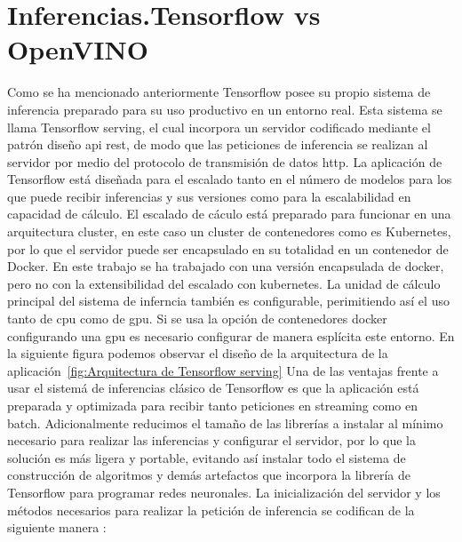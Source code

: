 \section{Inferencias.Tensorflow vs OpenVINO}\label{sec:inferencias.-Tensorflow-vs-OpenVINO}
Como se ha mencionado anteriormente Tensorflow posee su propio sistema de inferencia preparado para su uso productivo en un entorno real.
Esta sistema se llama Tensorflow serving, el cual incorpora un servidor codificado mediante el patrón diseño api rest, de modo que las peticiones
de inferencia se realizan al servidor por medio del protocolo de transmisión de datos http.
La aplicación de Tensorflow está diseñada para el escalado tanto en el número de modelos para los que puede recibir inferencias y sus versiones como para la escalabilidad en capacidad de cálculo.
El escalado de cáculo está preparado para funcionar en una arquitectura cluster, en este caso un cluster de contenedores como es Kubernetes, por lo que el servidor puede ser
encapsulado en su totalidad en un contenedor de Docker.
En este trabajo se ha trabajado con una versión encapsulada de docker, pero no con la extensibilidad del escalado con kubernetes.
La unidad de cálculo principal del sistema de inferncia también es configurable, perimitiendo así el uso tanto de cpu como de gpu.
Si se usa la opción de contenedores docker configurando una gpu es necesario configurar de manera esplícita este entorno.
En la siguiente figura podemos observar el diseño de la arquitectura de la aplicación~\ref{fig:Arquitectura de Tensorflow serving}
Una de las ventajas frente a usar el sistemá de inferencias clásico de Tensorflow es que la aplicación está preparada y optimizada para recibir tanto peticiones en streaming como en batch.
Adicionalmente reducimos el tamaño de las librerías a instalar al mínimo necesario para realizar las inferencias y configurar el servidor, por lo que la solución es más ligera y portable, evitando así
instalar todo el sistema de construcción de algoritmos y demás artefactos que incorpora la librería de Tensorflow para programar redes neuronales.
La inicialización del servidor y los métodos necesarios para realizar la petición de inferencia se codifican de la siguiente manera :

